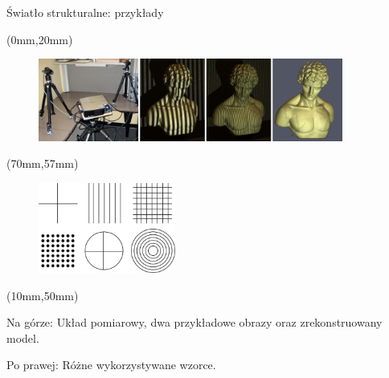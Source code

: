 \documentclass[xcolor=x11names,compress]{beamer}
\renewcommand{\(}{\begin{columns}}
\renewcommand{\)}{\end{columns}}
\newcommand{\<}[1]{\begin{column}{#1}}
\renewcommand{\>}{\end{column}}
\begin{document}
\begin{frame}{Światło strukturalne: przykłady}

    \begin{textblock*}{128mm}(0mm,20mm)%
    \begin{minipage}[l]{128mm}%

	\begin{figure}[h!]
    \centering
    \includegraphics[width=10cm]{../Common/img/struct_all}
    \end{figure}

    \end{minipage}
    \end{textblock*}

    \begin{textblock*}{50mm}(70mm,57mm)%
    \begin{minipage}[l]{50mm}%

	\begin{figure}[h!]
    \centering
    \includegraphics[width=4.5cm]{../Common/img/struct_patterns}
    \end{figure}

    \end{minipage}
    \end{textblock*}

    \begin{textblock*}{70mm}(10mm,50mm)%
    \begin{minipage}[l]{70mm}%

    \scriptsize
    \alert{Na górze:} Układ pomiarowy, dwa przykładowe obrazy oraz zrekonstruowany model.

    \vspace{2.5cm}

    \alert{Po prawej:} Różne wykorzystywane wzorce.

    \end{minipage}
    \end{textblock*}

\end{frame}
\end{document}
